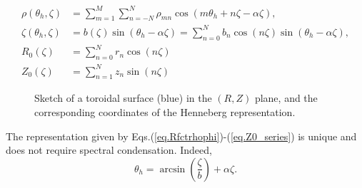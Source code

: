 \documentclass[my_thesis.tex]{subfiles}
\begin{document}
\begin{align}
	\rho(\theta_h,\zeta) &= \sum_{m=1}^{M}\sum_{n=-N}^N \rho_{mn}\cos(m\theta_h +n\zeta -\alpha \zeta),\label{eq.rho_series}\\
	\zeta(\theta_h,\zeta) &= b(\zeta)\sin(\theta_h-\alpha\zeta) =  \sum_{n=0}^N b_n\cos(n\zeta)\sin(\theta_h-\alpha \zeta), \label{eq.zeta_series}\\
	R_0(\zeta) &= \sum_{n=0}^{N} r_n \cos(n \zeta)\label{eq.R0_series}\\
	Z_0(\zeta) &= \sum_{n=1}^{N} z_n \sin(n \zeta)\label{eq.Z0_series}
\end{align}

\begin{figure}
	\centering
	\caption{Sketch of a toroidal surface (blue) in the $(R,Z)$ plane, and the corresponding coordinates of the Henneberg representation.}
	\label{fig. sketch Henneberg representation}
\end{figure}

The representation given by Eqs.(\ref{eq.Rfctrhophi})-(\ref{eq.Z0_series}) is unique and does not require spectral condensation. Indeed, 
\begin{equation}
	\theta_h = \arcsin\left(\frac{\zeta}{b}\right) + \alpha\zeta. \label{eq. henneberg angle}
\end{equation}
\end{document}
